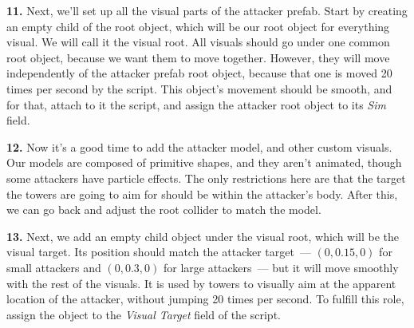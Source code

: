 \textbf{11.}
Next, we'll set up all the visual parts of the attacker prefab.
Start by creating an empty child of the root object, which will be our root object for everything visual.
We will call it the visual root.
All visuals should go under one common root object, because we want them to move together.
However, they will move independently of the attacker prefab root object, because that one is moved 20 times per second by the  script.
This object's movement should be smooth, and for that, attach to it the  script, and assign the attacker root object to its \emph{Sim} field.

\textbf{12.}
Now it's a good time to add the attacker model, and other custom visuals.
Our models are composed of primitive shapes, and they aren't animated, though some attackers have particle effects.
The only restrictions here are that the target the towers are going to aim for should be within the attacker's body.
After this, we can go back and adjust the root collider to match the model.

\textbf{13.}
Next, we add an empty child object under the visual root, which will be the visual target.
Its position should match the attacker target~--- $(0, 0.15, 0)$ for small attackers and $(0, 0.3, 0)$ for large attackers~--- but it will move smoothly with the rest of the visuals.
It is used by towers to visually aim at the apparent location of the attacker, without jumping 20 times per second.
To fulfill this role, assign the object to the \emph{Visual Target} field of the  script.


